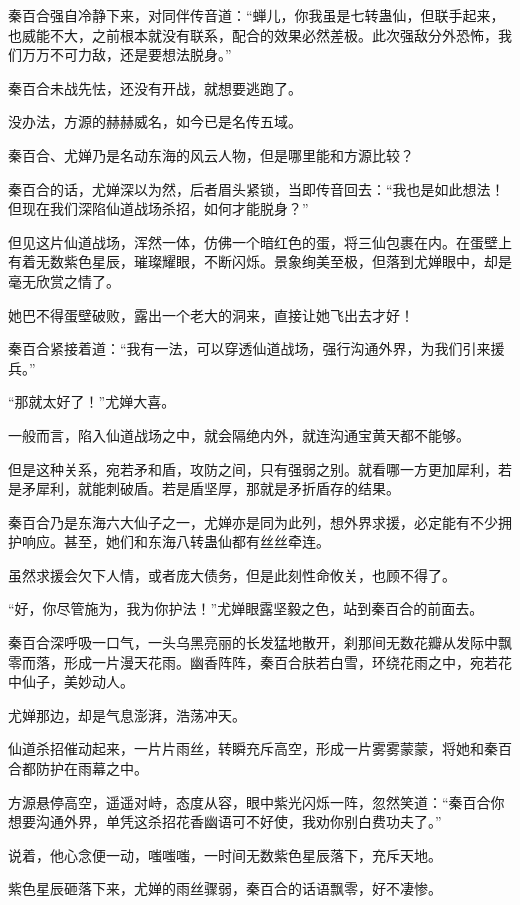 \begin{this_body}
秦百合强自冷静下来，对同伴传音道：“蝉儿，你我虽是七转蛊仙，但联手起来，也威能不大，之前根本就没有联系，配合的效果必然差极。此次强敌分外恐怖，我们万万不可力敌，还是要想法脱身。”

秦百合未战先怯，还没有开战，就想要逃跑了。

没办法，方源的赫赫威名，如今已是名传五域。

秦百合、尤婵乃是名动东海的风云人物，但是哪里能和方源比较？

秦百合的话，尤婵深以为然，后者眉头紧锁，当即传音回去：“我也是如此想法！但现在我们深陷仙道战场杀招，如何才能脱身？”

但见这片仙道战场，浑然一体，仿佛一个暗红色的蛋，将三仙包裹在内。在蛋壁上有着无数紫色星辰，璀璨耀眼，不断闪烁。景象绚美至极，但落到尤婵眼中，却是毫无欣赏之情了。

她巴不得蛋壁破败，露出一个老大的洞来，直接让她飞出去才好！

秦百合紧接着道：“我有一法，可以穿透仙道战场，强行沟通外界，为我们引来援兵。”

“那就太好了！”尤婵大喜。

一般而言，陷入仙道战场之中，就会隔绝内外，就连沟通宝黄天都不能够。

但是这种关系，宛若矛和盾，攻防之间，只有强弱之别。就看哪一方更加犀利，若是矛犀利，就能刺破盾。若是盾坚厚，那就是矛折盾存的结果。

秦百合乃是东海六大仙子之一，尤婵亦是同为此列，想外界求援，必定能有不少拥护响应。甚至，她们和东海八转蛊仙都有丝丝牵连。

虽然求援会欠下人情，或者庞大债务，但是此刻性命攸关，也顾不得了。

“好，你尽管施为，我为你护法！”尤婵眼露坚毅之色，站到秦百合的前面去。

秦百合深呼吸一口气，一头乌黑亮丽的长发猛地散开，刹那间无数花瓣从发际中飘零而落，形成一片漫天花雨。幽香阵阵，秦百合肤若白雪，环绕花雨之中，宛若花中仙子，美妙动人。

尤婵那边，却是气息澎湃，浩荡冲天。

仙道杀招催动起来，一片片雨丝，转瞬充斥高空，形成一片雾雾蒙蒙，将她和秦百合都防护在雨幕之中。

方源悬停高空，遥遥对峙，态度从容，眼中紫光闪烁一阵，忽然笑道：“秦百合你想要沟通外界，单凭这杀招花香幽语可不好使，我劝你别白费功夫了。”

说着，他心念便一动，嗤嗤嗤，一时间无数紫色星辰落下，充斥天地。

紫色星辰砸落下来，尤婵的雨丝骤弱，秦百合的话语飘零，好不凄惨。


\end{this_body}
